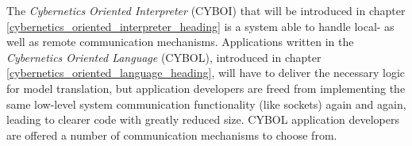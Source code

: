 The \emph{Cybernetics Oriented Interpreter} (CYBOI) that will be introduced in
chapter \ref{cybernetics_oriented_interpreter_heading} is a system able to
handle local- as well as remote communication mechanisms. Applications written
in the \emph{Cybernetics Oriented Language} (CYBOL), introduced in chapter
\ref{cybernetics_oriented_language_heading}, will have to deliver the necessary
logic for model translation, but application developers are freed from
implementing the same low-level system communication functionality (like
sockets) again and again, leading to clearer code with greatly reduced size.
CYBOL application developers are offered a number of communication mechanisms
to choose from.
